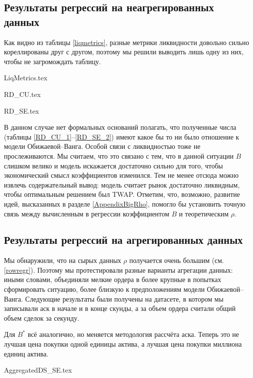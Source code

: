 \subsection{Результаты регрессий на неагрегированных данных}
Как видно из таблицы \ref{liqmetrics}, разные метрики ликвидности довольно сильно кореллированы друг с другом, поэтому 
мы решили выводить лишь одну из них, чтобы не загромождать таблицу.
\par
{LiqMetrics.tex}

{RD_CU.tex}

{RD_SE.tex}


В данном случае нет формальных оснований полагать, что полученные числа 
(таблицы \ref{RD_CU_1}--\ref{RD_SE_2}) имеют какое бы то ни было отношение к модели 
Обижаевой--Ванга. Особой связи с ликвидностью тоже не прослеживаются. Мы считаем, что это связано с тем, 
что в данной ситуации $B$ слишком велико и модель искажается достаточно сильно для того, 
чтобы экономический смысл коэффициентов изменился. Тем не менее отсюда можно извлечь содержательный вывод:
модель считает рынок достаточно ликвидным, чтобы оптимальным решением был TWAP. 
Отметим, что, возможно, развитие идей, высказанных в разделе \ref{AppendixBigRho}, 
помогло бы установить точную связь между вычисленным в регрессии
коэффициентом $B$ и теоретическим $\rho$. 


\subsection{Результаты регрессий на агрегированных данных}
Мы обнаружили, что на сырых данных $\rho$ получается очень большим (см. \ref{rowregr}). Поэтому мы протестировали разные
варианты агрегации данных: иными словами, объединяли мелкие ордера в более крупные в попытках сформировать ситуацию,
более близкую к предположениям модели Обижаевой--Ванга. Следующие результаты были получены на датасете, в котором мы 
записывали аск в начале и в конце скунды, а за объем ордера считали общий объем сделок за секунду.
\par
Для $B ^*$ всё аналогично, но меняется методология рассчёта аска. Теперь это не лучшая цена покупки
одной единицы актива, а лучшая цена покупки миллиона единиц актива. 
\par

{AggregatedDS_SE.tex}

